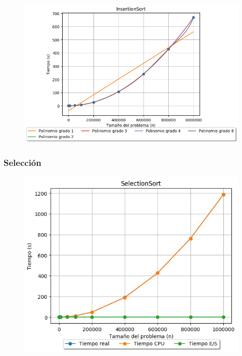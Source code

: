 \documentclass[12pt, fleqn]{report}                             %
\theoremstyle{break}                                            %
\begin{document}
    	        \begin{figure}[H]
    	            \centering
    	            \includegraphics[scale=0.86]{graphics/InsertionSort-Polynomials.png}
    	        \end{figure}
    	        
    	   \subsubsection{Selección}
    	        \begin{figure}[H]
    	            \centering
    	            \includegraphics[scale=0.86]{graphics/SelectionSort-ExperimentalTimes.png}
    	        \end{figure}
    	        
\end{document}
